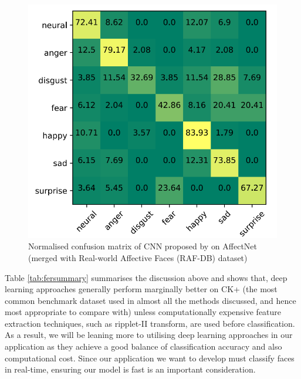 \documentclass[12pt, a4paper]{article}
\begin{document}
\begin{figure}[H]
    \centering
    \includegraphics[scale=0.55]{images/anconfmatrix.png}
    \caption{Normalised confusion matrix of CNN proposed by \cite{li2018occlusion} on AffectNet (merged with Real-world Affective Faces (RAF-DB) dataset)}
    \label{fig:anconfmatrix}
\end{figure}

Table \ref{tab:fersummary} summarises the discussion above and shows that, deep learning approaches generally perform marginally better on CK+ (the most common benchmark dataset used in almost all the methods discussed, and hence most appropriate to compare with) unless computationally expensive feature extraction techniques, such as ripplet-II transform, are used before classification. As a result, we will be leaning more to utilising deep learning approaches in our application as they achieve a good balance of classification accuracy and also computational cost. Since our application we want to develop must classify faces in real-time, ensuring our model is fast is an important consideration.
\end{document}
